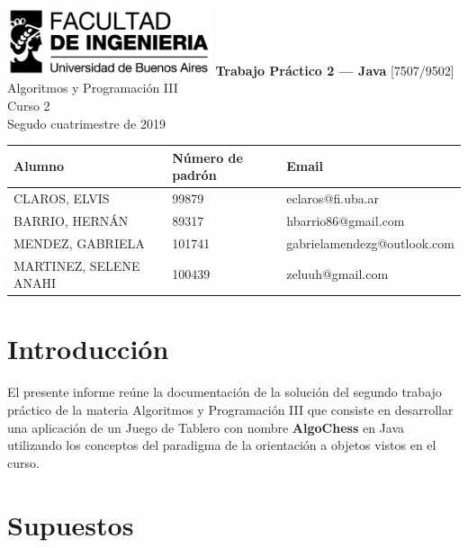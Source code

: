 \documentclass[titlepage,a4paper]{article}
\begin{document}
\begin{titlepage} %
	\hfill\includegraphics[width=6cm]{logofiuba.jpg}
    \centering
    \vfill
    \Huge \textbf{Trabajo Práctico 2 — Java}
    \vskip2cm
    \Large [7507/9502] Algoritmos y Programación III\\
    Curso 2 \\ %
    Segudo cuatrimestre de 2019 
    \vfill
    \begin{tabular}{ | l | l | l | } %
      \hline \hline
      Alumno & Número de padrón & Email\\ \hline \hline
      CLAROS, ELVIS & 99879 & eclaros@fi.uba.ar\\ \hline
      BARRIO, HERNÁN & 89317 & hbarrio86@gmail.com\\ \hline
      MENDEZ, GABRIELA & 101741 & gabrielamendezg@outlook.com\\ \hline
      MARTINEZ, SELENE ANAHI & 100439 & zeluuh@gmail.com\\ \hline
    
  	\end{tabular}
    \vfill
    \vfill
\end{titlepage}

\tableofcontents %
\newpage

\section{Introducción}\label{sec:intro}
El presente informe reúne la documentación de la solución del segundo trabajo práctico de la materia Algoritmos y Programación III que consiste en desarrollar una aplicación de un Juego de Tablero con nombre \textbf{AlgoChess} en Java utilizando los conceptos del paradigma de la orientación a objetos vistos en el curso.

\section{Supuestos}\label{sec:supuestos}
\end{document}
